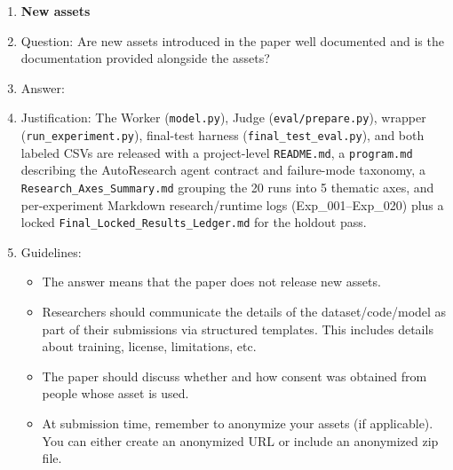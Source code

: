 \documentclass{article}
\begin{document}
\begin{enumerate}
\item {\bf New assets}
    \item[] Question: Are new assets introduced in the paper well documented and is the documentation provided alongside the assets?
    \item[] Answer: \answerYes{}
    \item[] Justification: The Worker (\texttt{model.py}), Judge (\texttt{eval/prepare.py}), wrapper (\texttt{run\_experiment.py}), final-test harness (\texttt{final\_test\_eval.py}), and both labeled CSVs are released with a project-level \texttt{README.md}, a \texttt{program.md} describing the AutoResearch agent contract and failure-mode taxonomy, a \texttt{Research\_Axes\_Summary.md} grouping the 20 runs into 5 thematic axes, and per-experiment Markdown research/runtime logs (Exp\_001--Exp\_020) plus a locked \texttt{Final\_Locked\_Results\_Ledger.md} for the holdout pass.
    \item[] Guidelines:
    \begin{itemize}
        \item The answer \answerNA{} means that the paper does not release new assets.
        \item Researchers should communicate the details of the dataset\slash code\slash model as part of their submissions via structured templates. This includes details about training, license, limitations, etc.
        \item The paper should discuss whether and how consent was obtained from people whose asset is used.
        \item At submission time, remember to anonymize your assets (if applicable). You can either create an anonymized URL or include an anonymized zip file.
    \end{itemize}


\end{enumerate}
\end{document}
